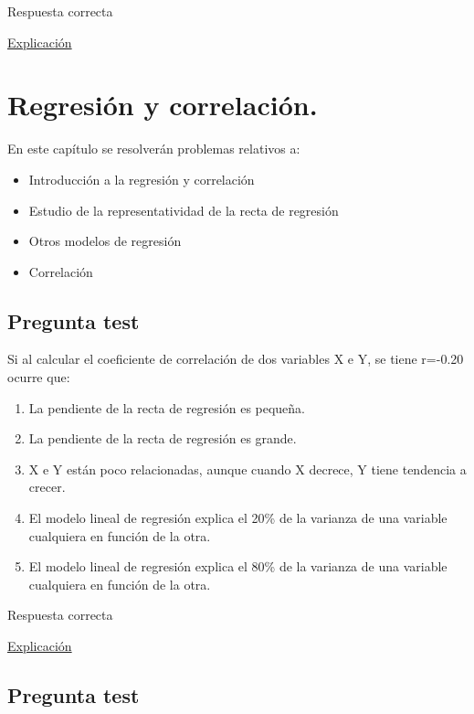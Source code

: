 \documentclass[
]{book}
\providecommand{\tightlist}{%
  \setlength{\itemsep}{0pt}\setlength{\parskip}{0pt}}
\begin{document}
Respuesta correcta

\href{https://homepage.divms.uiowa.edu/~mbognar/applets/normal.html}{Explicación}

\hypertarget{regresiuxf3n-y-correlaciuxf3n.}{%
\chapter{Regresión y correlación.}\label{regresiuxf3n-y-correlaciuxf3n.}}

En este capítulo se resolverán problemas relativos a:

\begin{itemize}
\tightlist
\item
  Introducción a la regresión y correlación
\item
  Estudio de la representatividad de la recta de regresión
\item
  Otros modelos de regresión
\item
  Correlación
\end{itemize}

\hypertarget{pregunta-test-110}{%
\section{Pregunta test}\label{pregunta-test-110}}

Si al calcular el coeficiente de correlación de dos variables X e Y, se tiene r=-0.20 ocurre que:

\begin{enumerate}
\def\labelenumi{\alph{enumi})}
\tightlist
\item
  La pendiente de la recta de regresión es pequeña.
\item
  La pendiente de la recta de regresión es grande.
\item
  X e Y están poco relacionadas, aunque cuando X decrece, Y tiene tendencia a crecer.
\item
  El modelo lineal de regresión explica el 20\% de la varianza de una variable cualquiera en función de la otra.
\item
  El modelo lineal de regresión explica el 80\% de la varianza de una variable cualquiera en función de la otra.
\end{enumerate}

Respuesta correcta

\href{https://1fjmanzano.github.io/bioestadistica/relaci\%C3\%B3n-entre-variables-nume\%CC\%81ricas.html}{Explicación}

\hypertarget{pregunta-test-111}{%
\section{Pregunta test}\label{pregunta-test-111}}
\end{document}

